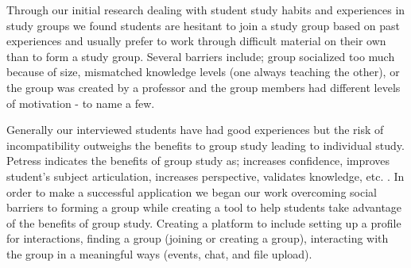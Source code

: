 \documentclass{sigchi-ext}
\begin{document}
Through our initial research dealing with student study habits and experiences
in study groups we found students are hesitant to join a study group based on
past experiences and usually prefer to work through difficult material on
their own than to form a study group. Several barriers include; group
socialized too much because of size, mismatched knowledge levels (one always
teaching the other), or the group was created by a professor and the group
members had different levels of motivation - to name a few.

Generally our interviewed students have had good experiences but the risk of
incompatibility outweighs the benefits to group study leading to individual
study. Petress indicates the benefits of group study as; increases confidence,
improves student’s subject articulation, increases perspective, validates
knowledge, etc. \cite{petress2004benefits}. In order to make a successful
application we began our work overcoming social barriers to forming a group
while creating a tool to help students take advantage of the benefits of group
study. Creating a platform to include setting up a profile for interactions,
finding a group (joining or creating a group), interacting with the group in a
meaningful ways (events, chat, and file upload).



\end{document}
